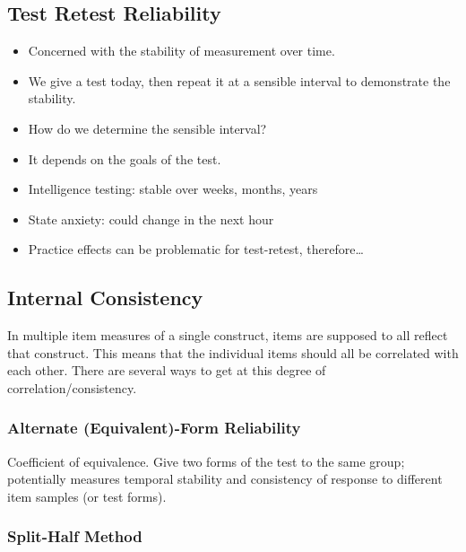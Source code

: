 \documentclass[
  english,
]{book}
\providecommand{\tightlist}{%
  \setlength{\itemsep}{0pt}\setlength{\parskip}{0pt}}
\begin{document}
\hypertarget{test-retest-reliability}{%
\subsection{Test Retest Reliability}\label{test-retest-reliability}}

\begin{itemize}
\tightlist
\item
  Concerned with the stability of measurement over time.
\item
  We give a test today, then repeat it at a sensible interval to demonstrate the stability.
\item
  How do we determine the sensible interval?
\item
  It depends on the goals of the test.
\item
  Intelligence testing: stable over weeks, months, years
\item
  State anxiety: could change in the next hour
\item
  Practice effects can be problematic for test-retest, therefore\ldots{}
\end{itemize}

\hypertarget{internal-consistency}{%
\subsection{Internal Consistency}\label{internal-consistency}}

In multiple item measures of a single construct, items are supposed to all reflect that construct. This means that the individual items should all be correlated with each other. There are several ways to get at this degree of correlation/consistency.

\hypertarget{alternate-equivalent-form-reliability}{%
\subsubsection{Alternate (Equivalent)-Form Reliability}\label{alternate-equivalent-form-reliability}}

Coefficient of equivalence. Give two forms of the test to the same group; potentially measures temporal stability and consistency of response to different item samples (or test forms).

\hypertarget{split-half-method}{%
\subsubsection{Split-Half Method}\label{split-half-method}}
\end{document}
